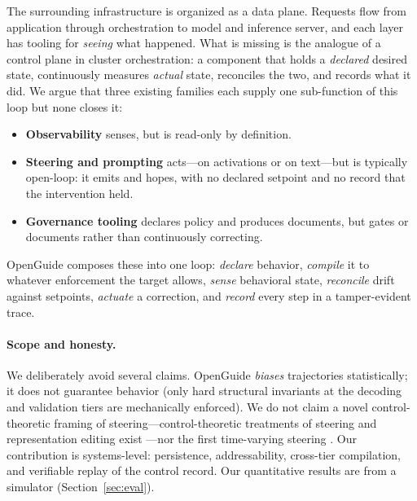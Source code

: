 \documentclass[11pt]{article}
\newcommand{\sys}{OpenGuide}
\begin{document}
The surrounding infrastructure is organized as a data plane. Requests flow from
application through orchestration to model and inference server, and each layer
has tooling for \emph{seeing} what happened. What is missing is the analogue of a
control plane in cluster orchestration: a component that holds a \emph{declared}
desired state, continuously measures \emph{actual} state, reconciles the two, and
records what it did. We argue that three existing families each supply one
sub-function of this loop but none closes it:

\begin{itemize}[nosep,leftmargin=*]
\item \textbf{Observability} senses, but is read-only by definition.
\item \textbf{Steering and prompting} acts---on activations
  \citep{turner2023actadd,zou2023repe,li2023iti,rimsky2023caa} or on text---but is
  typically open-loop: it emits and hopes, with no declared setpoint and no
  record that the intervention held.
\item \textbf{Governance tooling} declares policy and produces documents, but
  gates or documents rather than continuously correcting.
\end{itemize}

\sys{} composes these into one loop: \emph{declare} behavior, \emph{compile} it
to whatever enforcement the target allows, \emph{sense} behavioral state,
\emph{reconcile} drift against setpoints, \emph{actuate} a correction, and
\emph{record} every step in a tamper-evident trace.

\paragraph{Scope and honesty.}
We deliberately avoid several claims. \sys{} \emph{biases} trajectories
statistically; it does not guarantee behavior (only hard structural invariants at
the decoding and validation tiers are mechanically enforced). We do not claim a
novel control-theoretic framing of steering---control-theoretic treatments of
steering and representation editing exist
\citep{nguyen2025pidsteer,cheng2024liseco,kong2024recontrol}---nor the first time-varying
steering \citep{scalena2024dac}. Our contribution is systems-level: persistence,
addressability, cross-tier compilation, and verifiable replay of the control
record. Our quantitative results are from a simulator (Section~\ref{sec:eval}).
\end{document}
